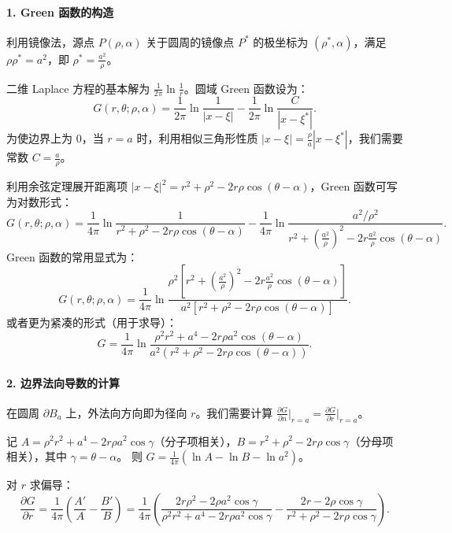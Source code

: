 \documentclass[12pt,a4paper]{ctexart}
\begin{document}
	\paragraph{1. Green 函数的构造}
	利用镜像法，源点 $P(\rho, \alpha)$ 关于圆周的镜像点 $P^*$ 的极坐标为 $(\rho^*, \alpha)$，满足 $\rho \rho^* = a^2$，即 $\rho^* = \frac{a^2}{\rho}$。
	
	二维 Laplace 方程的基本解为 $\frac{1}{2\pi} \ln \frac{1}{r}$。圆域 Green 函数设为：
	\begin{equation}
		G(r, \theta; \rho, \alpha) = \frac{1}{2\pi} \ln \frac{1}{|x-\xi|} - \frac{1}{2\pi} \ln \frac{C}{|x-\xi^*|}.
	\end{equation}
	为使边界上为 0，当 $r=a$ 时，利用相似三角形性质 $|x-\xi| = \frac{\rho}{a} |x-\xi^*|$，我们需要常数 $C = \frac{a}{\rho}$。
	
	利用余弦定理展开距离项 $|x-\xi|^2 = r^2 + \rho^2 - 2r\rho \cos(\theta-\alpha)$，Green 函数可写为对数形式：
	\begin{equation}
		G(r, \theta; \rho, \alpha) = \frac{1}{4\pi} \ln \frac{1}{r^2 + \rho^2 - 2r\rho \cos(\theta-\alpha)} - \frac{1}{4\pi} \ln \frac{a^2/\rho^2}{r^2 + (\frac{a^2}{\rho})^2 - 2r \frac{a^2}{\rho} \cos(\theta-\alpha)}.
	\end{equation}
	Green 函数的常用显式为：
	\begin{equation}
		G(r, \theta; \rho, \alpha) = \frac{1}{4\pi} \ln \frac{\rho^2 \left[ r^2 + (\frac{a^2}{\rho})^2 - 2r \frac{a^2}{\rho} \cos(\theta-\alpha) \right]}{a^2 \left[ r^2 + \rho^2 - 2r\rho \cos(\theta-\alpha) \right]}.
	\end{equation}
	或者更为紧凑的形式（用于求导）：
	\[
	G = \frac{1}{4\pi} \ln \frac{\rho^2 r^2 + a^4 - 2r\rho a^2 \cos(\theta-\alpha)}{a^2 (r^2 + \rho^2 - 2r\rho \cos(\theta-\alpha))}.
	\]
	
	\paragraph{2. 边界法向导数的计算}
	在圆周 $\partial B_a$ 上，外法向方向即为径向 $r$。我们需要计算 $\frac{\partial G}{\partial n} \big|_{r=a} = \frac{\partial G}{\partial r} \big|_{r=a}$。
	
	记 $A = \rho^2 r^2 + a^4 - 2r\rho a^2 \cos \gamma$（分子项相关），$B = r^2 + \rho^2 - 2r\rho \cos \gamma$（分母项相关），其中 $\gamma = \theta - \alpha$。
	则 $G = \frac{1}{4\pi} (\ln A - \ln B - \ln a^2)$。
	
	对 $r$ 求偏导：
	\[
	\frac{\partial G}{\partial r} = \frac{1}{4\pi} \left( \frac{A'}{A} - \frac{B'}{B} \right) 
	= \frac{1}{4\pi} \left( \frac{2r\rho^2 - 2\rho a^2 \cos\gamma}{\rho^2 r^2 + a^4 - 2r\rho a^2 \cos\gamma} - \frac{2r - 2\rho \cos\gamma}{r^2 + \rho^2 - 2r\rho \cos\gamma} \right).
	\]
	
\end{document}
